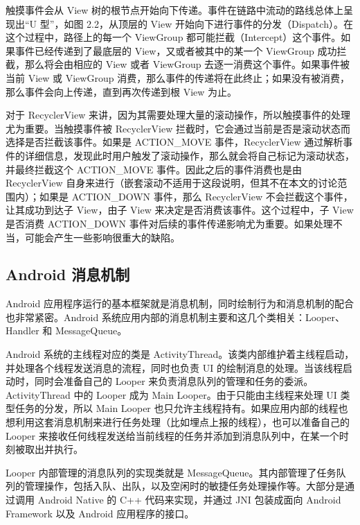 触摸事件会从 View 树的根节点开始向下传递。事件在链路中流动的路线总体上呈现出“U 型”，如图 2.2，从顶层的 View 开始向下进行事件的分发（Dispatch）。在这个过程中，路径上的每一个 ViewGroup 都可能拦截（Intercept）这个事件\cite{wu2017appcheck}。如果事件已经传递到了最底层的 View，又或者被其中的某一个 ViewGroup 成功拦截，那么将会由相应的 View 或者 ViewGroup 去逐一消费这个事件。如果事件被当前 View 或 ViewGroup 消费，那么事件的传递将在此终止；如果没有被消费，那么事件会向上传递，直到再次传递到根 View 为止。

对于 RecyclerView 来讲，因为其需要处理大量的滚动操作，所以触摸事件的处理尤为重要。当触摸事件被 RecyclerView 拦截时，它会通过当前是否是滚动状态而选择是否拦截该事件。如果是 ACTION\_MOVE 事件，RecyclerView 通过解析事件的详细信息，发现此时用户触发了滚动操作，那么就会将自己标记为滚动状态，并最终拦截这个 ACTION\_MOVE 事件。因此之后的事件消费也是由 RecyclerView 自身来进行（嵌套滚动不适用于这段说明，但其不在本文的讨论范围内）；如果是 ACTION\_DOWN 事件，那么 RecyclerView 不会拦截这个事件，让其成功到达子 View，由子 View 来决定是否消费该事件。这个过程中，子 View 是否消费 ACTION\_DOWN 事件对后续的事件传递影响尤为重要。如果处理不当，可能会产生一些影响很重大的缺陷。


\subsection{Android 消息机制}

Android 应用程序运行的基本框架就是消息机制，同时绘制行为和消息机制的配合也非常紧密。Android 系统应用内部的消息机制主要和这几个类相关：Looper、Handler 和 MessageQueue。

Android 系统的主线程对应的类是 ActivityThread。该类内部维护着主线程启动，并处理各个线程发送消息的流程，同时也负责 UI 的绘制消息的处理。当该线程启动时，同时会准备自己的 Looper 来负责消息队列的管理和任务的委派。ActivityThread 中的 Looper 成为 Main Looper。由于只能由主线程来处理 UI 类型任务的分发，所以 Main Looper 也只允许主线程持有。如果应用内部的线程也想利用这套消息机制来进行任务处理（比如埋点上报的线程），也可以准备自己的 Looper 来接收任何线程发送给当前线程的任务并添加到消息队列中，在某一个时刻被取出并执行。

Looper 内部管理的消息队列的实现类就是 MessageQueue。其内部管理了任务队列的管理操作，包括入队、出队，以及空闲时的敏捷任务处理操作等\cite{goransson2014efficient}。大部分是通过调用 Android Native 的 C++ 代码来实现，并通过 JNI 包装成面向 Android Framework 以及 Android 应用程序的接口。

